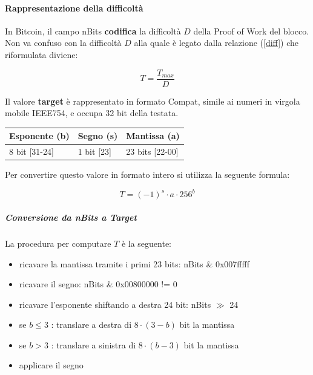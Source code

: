\documentclass{book}
\theoremstyle{definition}
\begin{document}
\paragraph{Rappresentazione della difficoltà}


In Bitcoin, il campo nBits \textbf{codifica} la difficoltà $D$ della Proof of Work del blocco.
Non va confuso con la difficoltà $D$ alla quale è legato dalla relazione (\ref{diff}) che riformulata diviene:

\begin{equation}
    T = \frac{T_{max}}{D} \label{targetFromDiff}
\end{equation}

Il valore \textbf{target} è rappresentato in formato Compat, simile ai numeri in virgola mobile IEEE754, e occupa 32 bit della testata.

\begin{table}[ht]
    \centering
    \begin{tabular}{|l|l|l|}
        \hline
        \multicolumn{1}{|c|}{Esponente (b)} & \multicolumn{1}{c|}{Segno (s)} & \multicolumn{1}{c|}{Mantissa (a)} \\ \hline
        8 bit {[}31-24{]}               & 1 bit {[}23{]}             & 23 bits {[}22-00{]}           \\ \hline
    \end{tabular}
\end{table}

Per convertire questo valore in formato intero si utilizza la seguente formula:

\begin{equation}
    T = (-1)^{s} \cdot a \cdot 256^{b}
\end{equation}

\subparagraph{Conversione da nBits a Target}

La procedura per computare $T$ è la seguente:

\begin{itemize}
    \item ricavare la mantissa tramite i primi 23 bits: nBits \& 0x007fffff
    \item ricavare il segno: nBits \& 0x00800000 != 0
    \item ricavare l'esponente shiftando a destra 24 bit: nBits $\gg$ 24
    \item se $b \le 3$ : translare a destra di $8 \cdot {(3 - b)}$ bit la mantissa
    \item se $b > 3$ : translare a sinistra di $8 \cdot {(b - 3)}$ bit la mantissa
    \item applicare il segno
\end{itemize}
\end{document}

